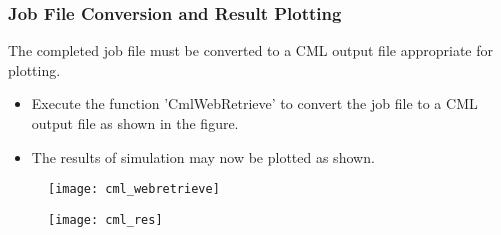 \begin{frame}
  \frametitle{Job File Conversion and Result Plotting}

  The completed job file must be converted to a CML output file appropriate for plotting.
  \begin{itemize}
  \item Execute the function 'CmlWebRetrieve' to convert the job file to a CML output file as shown in the figure.
  \item The results of simulation may now be plotted as shown.
  \end{itemize}

  \centering
  \begin{figure}
    \texttt{[image: cml\_webretrieve]}
  \end{figure}

\end{frame}



\begin{frame}

  \centering
  \begin{figure}
    \texttt{[image: cml\_res]}
  \end{figure}

\end{frame}





